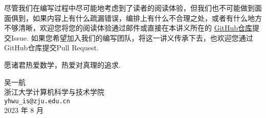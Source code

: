 尽管我们在编写过程中尽可能地考虑到了读者的阅读体验，但我们也不可能做到面面俱到，如果内容上有什么疏漏错误，编排上有什么不合理之处，或者有什么地方不够清晰，欢迎您将您的阅读体验通过邮件或直接在本讲义所在的 \href{https://github.com/yhwu-is/Linear-Algebra-Left-Undone}{GitHub仓库}提交Issue. 如果您希望加入我们的编写团队，将这一讲义传承下去，也欢迎您通过GitHub仓库提交Pull Request.

愿诸君热爱数学，热爱对真理的追求.

\begin{flushright}
    \kaishu
    吴一航 \\
    浙江大学计算机科学与技术学院 \\
    \verb|yhwu_is@zju.edu.cn| \\
    2023 年 8 月
\end{flushright}
